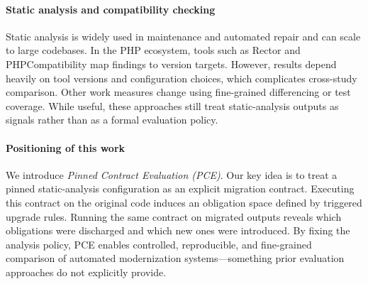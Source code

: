 \paragraph*{Static analysis and compatibility checking}
Static analysis is widely used in maintenance and automated repair and can scale to large codebases.\cite{legoues2012genprog,DBLP:conf/icse/NguyenQRC13,DBLP:conf/issta/MartinezM16,DBLP:conf/issta/JustJE14,DBLP:conf/icse/GazzolaMM18,bessey2010billion,calcagno2015moving}
In the PHP ecosystem, tools such as Rector and PHPCompatibility map findings to version targets.\cite{phpcompat,rector,php83spec}
However, results depend heavily on tool versions and configuration choices, which complicates cross-study comparison.
Other work measures change using fine-grained differencing or test coverage.\cite{fluri2007change,falleri2014fine,kochhar2015coverage}
While useful, these approaches still treat static-analysis outputs as signals rather than as a formal evaluation policy.

\paragraph*{Positioning of this work}
We introduce \emph{Pinned Contract Evaluation (PCE)}.
Our key idea is to treat a pinned static-analysis configuration as an explicit migration contract.
Executing this contract on the original code induces an obligation space defined by triggered upgrade rules.
Running the same contract on migrated outputs reveals which obligations were discharged and which new ones were introduced.
By fixing the analysis policy, PCE enables controlled, reproducible, and fine-grained comparison of automated modernization systems—something prior evaluation approaches do not explicitly provide.